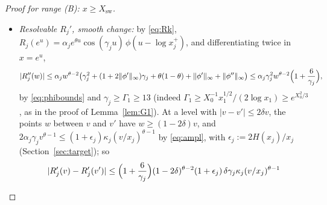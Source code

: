 \begin{proof}[Proof for range \textup{(B)}: $x\ge X_{\mathrm{sw}}$]
\begin{itemize}
  $[v,(1+\kappa)v]$ and $[v',(1+\kappa)v']$ overlap (as $2\delta<\kappa$) and differ by two intervals of length $\le2\delta(1+\kappa)v$,
  which enter the difference of the counts with opposite signs; so the counts differ by at most
  $2\delta(1+\kappa)v+1$, and the normalisations $\kappa v$, $\kappa v'$ change the quotient by at most $2.01\delta(1+1/(\kappa v))$,
  which is smaller; and $\rhodet(v)+\rhodet(v')\le\Psi(2v,X_0)/(\kappa v)+\Psi(2v,X_0)/(\kappa v')\le3\Psi(2v,X_0)/(\kappa v)$, as
  $(1+\kappa)v'\le2v$. Put $u:=\log v/\Lambda$
  and $U_0:=\Lambda$. Use the first bound for $u<U_0$ and the second beyond; for $u\ge U_0$, Rankin's bound (exponent
  $1-1/(2\Lambda)$) gives $\Psi(2v,X_0)\le10v\Lambda^{1.65}e^{-u/2}$. With the weights of Corollary~\ref{cor:saias}
  ($\sum_{v<X_0^{U_0}}\log(2v)\le1.5(U_0\Lambda)^2$) and $1/\kappa\le X_0^{5/12}$, $\log x$ times this part of $\rhosh(x)-\rhosh(y)$
  is at most
  \begin{multline*}
    C_S\Big[1.5\Lambda^4(4.0001\,\delta+2/X_0)/\kappa+\sum_{u\ge\Lambda}\log(2v)\cdot30\Lambda^{1.65}e^{-u/2}/\kappa\Big]\\
    \le C_S\big[7\Lambda^4X_0^{-1/12}+90\Lambda^{4.7}e^{-\Lambda/12}\big]\le e^{-10^6},
  \end{multline*}
  using $\delta\le X_0^{-1/2}$. Both terms decrease with $\Lambda$, so this holds for every $\Lambda\ge10^8$; at $\Lambda=10^8$ (with
  $C_S\le77$) the logarithm of the bound is $\le-8.33\cdot10^6$.
\item \emph{Resolvable $R_j'$, smooth change:} by \eqref{eq:Rk}, $R_j(e^u)=\alpha_je^{\theta u}\cos(\gamma_ju)\,\phi(u-\log x_j^+)$, and
  differentiating twice in $x=e^u$,
  \[
    |R_j''(w)|\le\alpha_jw^{\theta-2}\bigl(\gamma_j^2+(1+2\|\phi'\|_\infty)\gamma_j+\theta(1-\theta)+\|\phi'\|_\infty+\|\phi''\|_\infty\bigr)
    \le\alpha_j\gamma_j^2w^{\theta-2}\Bigl(1+\frac6{\gamma_j}\Bigr),
  \]
  by \eqref{eq:phibounds} and $\gamma_j\ge\Gamma_1\ge13$ (indeed $\Gamma_1\ge X_0^{-1}x_1^{1/2}/(2\log x_1)\ge e^{X_0^2/3}$, as in the proof of Lemma~\ref{lem:G1}). At a level with $|v-v'|\le2\delta v$, the points $w$ between $v$ and
  $v'$ have $w\ge(1-2\delta)v$, and $2\alpha_j\gamma_jv^{\theta-1}\le(1+\epsilon_j)\kappa_j(v/x_j)^{\theta-1}$ by \eqref{eq:ampl}, with
  $\epsilon_j:=2H(x_j)/x_j$ (Section~\ref{sec:target}); so
  \[
    |R_j'(v)-R_j'(v')|\le\Bigl(1+\frac6{\gamma_j}\Bigr)(1-2\delta)^{\theta-2}(1+\epsilon_j)\,\delta\gamma_j\kappa_j(v/x_j)^{\theta-1}
\]
\end{itemize}
\end{proof}
